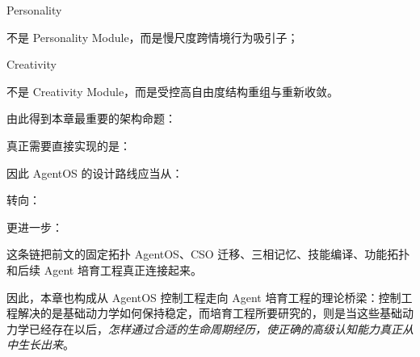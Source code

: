 \begin{statementbox}
Personality
\end{statementbox}

不是 Personality Module，而是慢尺度跨情境行为吸引子；

\begin{statementbox}
Creativity
\end{statementbox}

不是 Creativity Module，而是受控高自由度结构重组与重新收敛。

由此得到本章最重要的架构命题：

\begin{statementbox}
\centering
{}
\end{statementbox}

真正需要直接实现的是：

\begin{statementbox}
\centering
{}
\end{statementbox}

因此 AgentOS 的设计路线应当从：

\begin{statementbox}
\centering
{}
\end{statementbox}

转向：

\begin{statementbox}
\centering
{}
\end{statementbox}

更进一步：

\begin{statementbox}
\centering
{}
\end{statementbox}

这条链把前文的固定拓扑 AgentOS、CSO 迁移、三相记忆、技能编译、功能拓扑和后续 Agent 培育工程真正连接起来。

因此，本章也构成从 AgentOS 控制工程走向 Agent 培育工程的理论桥梁：控制工程解决的是基础动力学如何保持稳定，而培育工程所要研究的，则是当这些基础动力学已经存在以后，\emph{怎样通过合适的生命周期经历，使正确的高级认知能力真正从中生长出来}。

